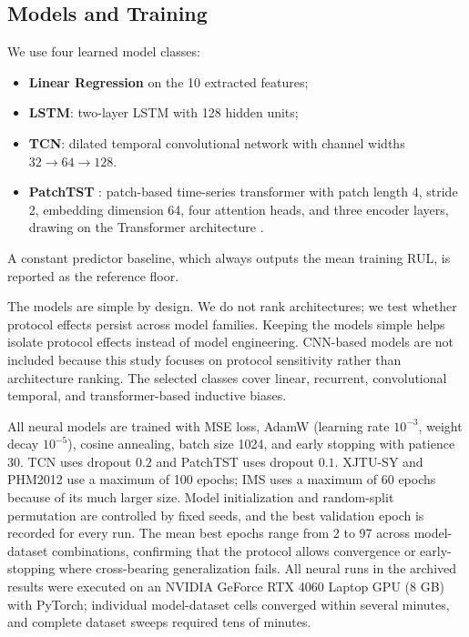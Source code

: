 \documentclass[pdflatex,sn-basic,NameDate]{sn-jnl}
\begin{document}
\subsection{Models and Training}
We use four learned model classes:
\begin{itemize}
    \item \textbf{Linear Regression} on the 10 extracted features;
    \item \textbf{LSTM}: two-layer LSTM with 128 hidden units;
    \item \textbf{TCN}: dilated temporal convolutional network with channel widths $32 \to 64 \to 128$.
    \item \textbf{PatchTST} \citep{patchtst2023}: patch-based time-series transformer with patch length 4, stride 2, embedding dimension 64, four attention heads, and three encoder layers, drawing on the Transformer architecture \citep{vaswani2017attention}.
\end{itemize}
A constant predictor baseline, which always outputs the mean training RUL, is reported as the reference floor.

The models are simple by design. We do not rank architectures; we test whether protocol effects persist across model families. Keeping the models simple helps isolate protocol effects instead of model engineering. CNN-based models are not included because this study focuses on protocol sensitivity rather than architecture ranking. The selected classes cover linear, recurrent, convolutional temporal, and transformer-based inductive biases.

All neural models are trained with MSE loss, AdamW (learning rate $10^{-3}$, weight decay $10^{-5}$), cosine annealing, batch size 1024, and early stopping with patience 30. TCN uses dropout $0.2$ and PatchTST uses dropout $0.1$. XJTU-SY and PHM2012 use a maximum of 100 epochs; IMS uses a maximum of 60 epochs because of its much larger size. Model initialization and random-split permutation are controlled by fixed seeds, and the best validation epoch is recorded for every run. The mean best epochs range from 2 to 97 across model-dataset combinations, confirming that the protocol allows convergence or early-stopping where cross-bearing generalization fails. All neural runs in the archived results were executed on an NVIDIA GeForce RTX 4060 Laptop GPU (8 GB) with PyTorch; individual model-dataset cells converged within several minutes, and complete dataset sweeps required tens of minutes.
\end{document}
